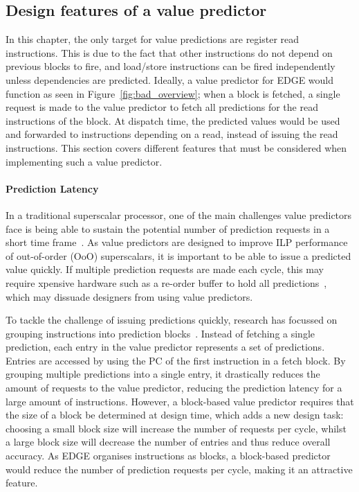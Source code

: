 \subsection{Design features of a value predictor}

In this chapter, the only target for value predictions are register read instructions.
This is due to the fact that other instructions do not depend on previous blocks to fire, and load/store instructions can be fired independently unless dependencies are predicted.
Ideally, a value predictor for EDGE would function as seen in Figure~\ref{fig:bad_overview}; when a block is fetched, a single request is made to the value predictor to fetch all predictions for the read instructions of the block.
At dispatch time, the predicted values would be used and forwarded to instructions depending on a read, instead of issuing the read instructions.
This section covers different features that must be considered when implementing such a value predictor.


\paragraph*{Prediction Latency}
In a traditional superscalar processor, one of the main challenges value predictors face is being able to sustain the potential number of prediction requests in a short time frame~\cite{peraisBeBop2015}.
As value predictors are designed to improve ILP performance of out-of-order (OoO) superscalars, it is important to be able to issue a predicted value quickly.
If multiple prediction requests are made each cycle, this may require xpensive hardware such as a re-order buffer to hold all predictions~\cite{peraisBeBop2015}, which may dissuade designers from using value predictors.

To tackle the challenge of issuing predictions quickly, research has focussed on grouping instructions into prediction blocks~\cite{peraisBeBop2015}.
Instead of fetching a single prediction, each entry in the value predictor represents a set of predictions.
Entries are accessed by using the PC of the first instruction in a fetch block.
By grouping multiple predictions into a single entry, it drastically reduces the amount of requests to the value predictor, reducing the prediction latency for a large amount of instructions.
However, a block-based value predictor requires that the size of a block be determined at design time, which adds a new design task: choosing a small block size will increase the number of requests per cycle, whilst a large block size will decrease the number of entries and thus reduce overall accuracy.
As EDGE organises instructions as blocks, a block-based predictor would reduce the number of prediction requests per cycle, making it an attractive feature.


